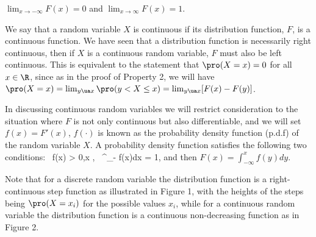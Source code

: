 \item [4.] $\lim_{x\to -\infty} F(x) = 0$ and $\lim_{x\to \infty} F(x) = 1$.

We say that a random variable $X$ is continuous if its distribution function, $F$, is a continuous function. We have seen that a distribution function is necessarily right continuous, then if $X$ is a continuous random variable, $F$ must also be left continuous. This is equivalent to the statement that $\pro (X = x) = 0$ for all $x \in \R$, since as in the proof of Property 2, we will have $\pro(X = x) = \lim_{y\ua x} \pro(y < X \leq x) = \lim_{y\ua x} [F(x) - F(y)]$.

In discussing continuous random variables we will restrict consideration to the situation where $F$ is not only continuous but also differentiable, and we will set $f(x) = F'(x)$, $f(\cdot)$ is known as the probability density function (p.d.f) of the random variable $X$. A
probability density function satisfies the following two conditions:
\be
{}\ f(x) > 0,x \in \R,\quad\quad {} \ \int^\infty_{-\infty} f(x)dx = 1,
\ee
and then $F(x) = \int^x_{-\infty} f(y)dy$.

Note that for a discrete random variable the distribution function is a right-continuous step function as illustrated in Figure 1, with the heights of the steps being $\pro(X = x_i)$ for the possible values $x_i$, while for a continuous random variable the distribution function is a continuous non-decreasing function as in Figure 2.




